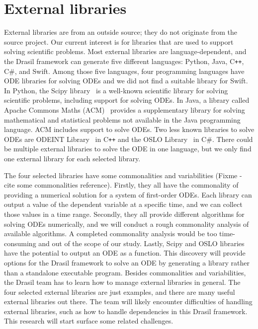 \chapter{External libraries}
\label{cha_extlib}
External libraries are from an outside source; they do not originate from the source project. Our current interest is for libraries that are used to support solving scientific problems. Most external libraries are language-dependent, and the Drasil framework can generate five different languages: Python, Java, C\texttt{++}, C\#, and Swift. Among those five languages, four programming languages have ODE libraries for solving ODEs and we did not find a suitable library for Swift. In Python, the Scipy library~\citep{scipy} is a well-known scientific library for solving scientific problems, including support for solving ODEs. In Java, a library called Apache Commons Maths (ACM)~\citep{apache} provides a supplementary library for solving mathematical and statistical problems not available in the Java programming language. ACM includes support to solve ODEs. Two less known libraries to solve ODEs are ODEINT Library~\citep{odeint} in C\texttt{++} and the OSLO Library~\citep{oslo} in C\#. There could be multiple external libraries to solve the ODE in one language, but we only find one external library for each selected library. 

The four selected libraries have some commonalities and variabilities (Fixme - cite some commonalities reference). Firstly, they all have the commonality of providing a numerical solution for a system of first-order ODEs. Each library can output a value of the dependent variable at a specific time, and we can collect those values in a time range. Secondly, they all provide different algorithms for solving ODEs numerically, and we will conduct a rough commonality analysis of available algorithms. A completed commonality analysis would be too time-consuming and out of the scope of our study. Lastly, Scipy and OSLO libraries have the potential to output an ODE as a function. This discovery will provide options for the Drasil framework to solve an ODE by generating a library rather than a standalone executable program. Besides commonalities and variabilities, the Drasil team has to learn how to manage external libraries in general. The four selected external libraries are just examples, and there are many useful external libraries out there. The team will likely encounter difficulties of handling external libraries, such as how to handle dependencies in this Drasil framework. This research will start surface some related challenges.

